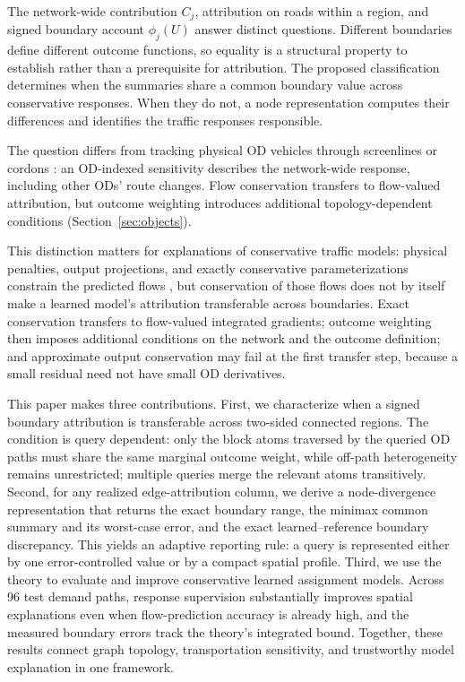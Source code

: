 \documentclass[a4paper,fleqn]{cas-sc}
\begin{document}
The network-wide contribution $C_j$, attribution on roads within a region,
and signed boundary account $\phi_j(U)$ answer distinct questions.
Different boundaries define different outcome functions, so equality is a
structural property to establish rather than a prerequisite for attribution.
The proposed classification determines when the summaries share a common
boundary value across conservative responses. When they do not, a node
representation computes their differences and identifies the traffic
responses responsible.

The question differs from tracking physical OD vehicles through screenlines
or cordons \citep{sheffi1985urban,vanzuylen1980most,bar2002origin}:
an OD-indexed sensitivity describes the network-wide response,
including other ODs' route changes. Flow conservation transfers to
flow-valued attribution, but outcome weighting introduces additional
topology-dependent conditions (Section~\ref{sec:objects}).

This distinction matters for explanations of conservative traffic
models: physical penalties, output projections, and exactly
conservative parameterizations constrain the predicted flows
\citep{raissi2019physics,shi2021physics,valente2025physics,richterpowell2022neural},
but conservation of those flows does not by itself make a learned
model's attribution transferable across boundaries. Exact
conservation transfers to flow-valued integrated gradients; outcome
weighting then imposes additional conditions on the network and the
outcome definition; and approximate output conservation may fail at
the first transfer step, because a small residual need not have small
OD derivatives.

This paper makes three contributions. First, we characterize when a
signed boundary attribution is transferable across two-sided connected
regions. The condition is query dependent: only the block atoms
traversed by the queried OD paths must share the same marginal outcome
weight, while off-path heterogeneity remains unrestricted; multiple
queries merge the relevant atoms transitively. Second, for any realized
edge-attribution column, we derive a node-divergence representation
that returns the exact boundary range, the minimax common summary and
its worst-case error, and the exact learned--reference boundary
discrepancy. This yields an adaptive reporting rule: a query is
represented either by one error-controlled value or by a compact
spatial profile. Third, we use the theory to evaluate and improve
conservative learned assignment models. Across 96 test demand paths,
response supervision substantially improves spatial explanations even
when flow-prediction accuracy is already high, and the measured
boundary errors track the theory's integrated bound. Together, these
results connect graph topology, transportation sensitivity, and
trustworthy model explanation in one framework.
\end{document}
